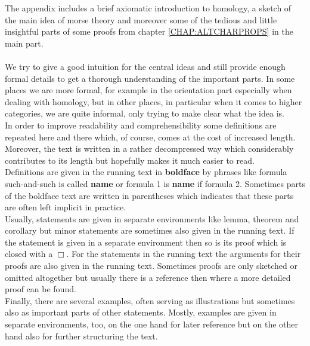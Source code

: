 The appendix includes a brief axiomatic introduction to homology, a sketch of the main idea of morse theory and moreover some of the tedious and little insightful parts of some proofs from chapter \ref{CHAP:ALTCHARPROPS} in the main part.
\\\\
We try to give a good intuition for the central ideas and still provide enough formal details to get a thorough understanding of the important parts. In some places we are more formal, for example in the orientation part especially when dealing with homology, but in other places, in particular when it comes to higher categories, we are quite informal, only trying to make clear what the idea is.
\\
In order to improve readability and comprehensibility some definitions are repeated here and there which, of course, comes at the cost of increased length. Moreover, the text is written in a rather decompressed way which considerably contributes to its length but hopefully makes it much easier to read.
\\
Definitions are given in the running text in \textbf{boldface} by phrases like {\glqq}formula such-and-such is called \textbf{name}{\grqq} or {\glqq}formula 1 is \textbf{name} if formula 2{\grqq}. Sometimes parts of the boldface text are written in parentheses which indicates that these parts are often left implicit in practice.
\\
Usually, statements are given in separate environments like lemma, theorem and corollary but minor statements are sometimes also given in the running text. If the statement is given in a separate environment then so is its proof which is closed with a $\Box$. For the statements in the running text the arguments for their proofs are also given in the running text. Sometimes proofs are only sketched or omitted altogether but usually there is a reference then where a more detailed proof can be found.
\\
Finally, there are several examples, often serving as illustrations but sometimes also as important parts of other statements. Mostly, examples are given in separate environments, too, on the one hand for later reference but on the other hand also for further structuring the text.

